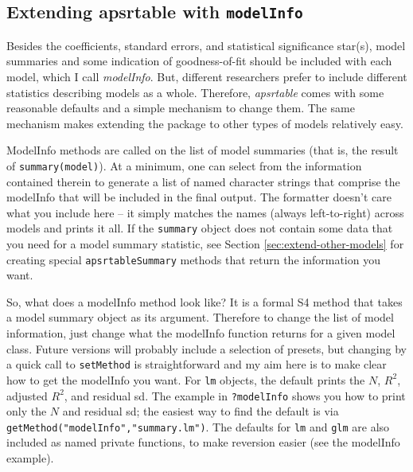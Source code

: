 \documentclass[10pt]{article} %
\begin{document}
\subsection{Extending apsrtable with \texttt{modelInfo}}
\label{sec:modelinfo}



Besides the coefficients, standard errors, and statistical significance star(s), model summaries and some indication of goodness-of-fit should be included with each model, which I call \textit{modelInfo}. But, different researchers prefer to include different statistics describing models as a whole. Therefore, \textit{apsrtable} comes with some reasonable defaults and a simple mechanism to change them. The same mechanism makes extending the package to other types of models relatively easy.

ModelInfo methods are called on the list of model summaries (that is, the result of \verb|summary(model)|). At a minimum, one can select from the information contained therein to generate a list of named character strings that comprise the modelInfo that will be included in the final output. The formatter doesn't care what you include here -- it simply matches the names (always left-to-right) across models and prints it all. If the \verb|summary| object does not contain some data that you need for a model summary statistic, see Section \ref{sec:extend-other-models} for creating special \texttt{apsrtableSummary} methods that return the information you want.

So, what does a modelInfo method look like? It is a formal S4 method that takes a model summary object as its argument. Therefore to change the list of model information, just change what the modelInfo function returns for a given model class. Future versions will probably include a selection of presets, but changing by a quick call to \verb|setMethod| is straightforward and my aim here is to make clear how to get the modelInfo you want. For \verb|lm| objects, the default prints the $N$, $R^2$, adjusted $R^2$, and residual sd. The example in \verb|?modelInfo| shows you how to print only the $N$ and residual sd; the easiest way to find the default is via \verb|getMethod("modelInfo","summary.lm")|. The defaults for \verb|lm| and \verb|glm| are also included as named private functions, to make reversion easier (see the modelInfo example).
\end{document}
